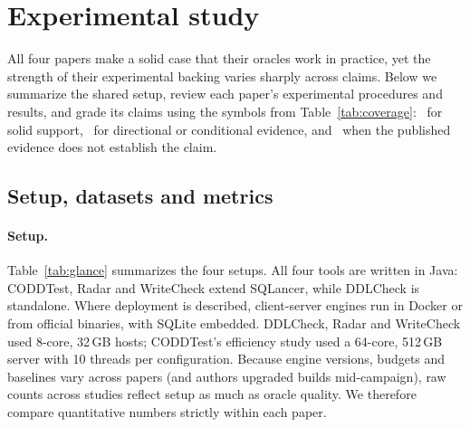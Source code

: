
\section{Experimental study}\label{sec:experiments}
All four papers make a solid case that their oracles work in practice, yet the strength of their experimental backing varies sharply across claims. Below we summarize the shared setup, review each paper's experimental procedures and results, and grade its claims using the symbols from Table~\ref{tab:coverage}: \yes\ for solid support, \half\ for directional or conditional evidence, and \no\ when the published evidence does not establish the claim.

\subsection{Setup, datasets and metrics}
\paragraph{Setup.} Table~\ref{tab:glance} summarizes the four setups. All four tools are written in Java: CODDTest, Radar and WriteCheck extend SQLancer, while DDLCheck is standalone. Where deployment is described, client-server engines run in Docker or from official binaries, with SQLite embedded. DDLCheck, Radar and WriteCheck used 8-core, 32\,GB hosts; CODDTest's efficiency study used a 64-core, 512\,GB server with 10 threads per configuration. Because engine versions, budgets and baselines vary across papers (and authors upgraded builds mid-campaign), raw counts across studies reflect setup as much as oracle quality. We therefore compare quantitative numbers strictly within each paper.

